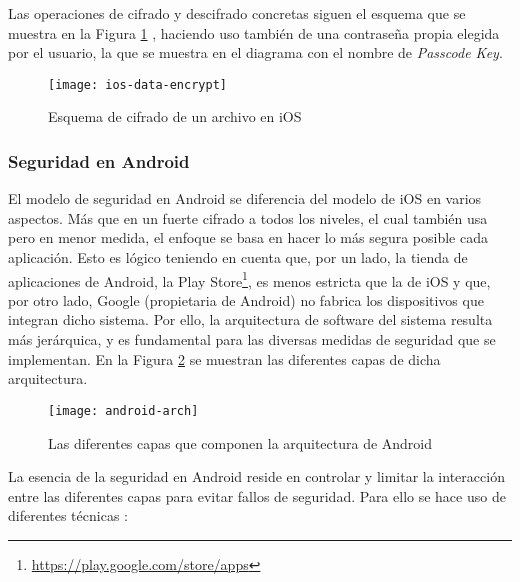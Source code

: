 Las operaciones de cifrado y descifrado concretas siguen el esquema que se muestra en la Figura \ref{fig:ios-data-encrypt} , haciendo uso también de una contraseña propia elegida por el usuario, la que se muestra en el diagrama con el nombre de \textit{Passcode Key}.

\begin{figure}[H]
	\centering
	\texttt{[image: ios-data-encrypt]}
	\caption{Esquema de cifrado de un archivo en iOS}
	\label{fig:ios-data-encrypt}
\end{figure}

\subsubsection{Seguridad en Android}

El modelo de seguridad en Android se diferencia del modelo de iOS en varios aspectos. Más que en un fuerte cifrado a todos los niveles, el cual también usa pero en menor medida, el enfoque se basa en hacer lo más segura posible cada aplicación. Esto es lógico teniendo en cuenta que, por un lado, la tienda de aplicaciones de Android, la Play Store\footnote{\url{https://play.google.com/store/apps}}, es menos estricta que la de iOS y que, por otro lado, Google (propietaria de Android) no fabrica los dispositivos que integran dicho sistema. Por ello, la arquitectura de software del sistema resulta más jerárquica, y es fundamental para las diversas medidas de seguridad que se implementan. En la Figura \ref{fig:android-arch} se muestran las diferentes capas de dicha arquitectura. 

\begin{figure}[H]
	\centering
	\texttt{[image: android-arch]}
	\caption{Las diferentes capas que componen la arquitectura de Android}
	\label{fig:android-arch}
\end{figure}

La esencia de la seguridad en Android reside en controlar y limitar la interacción entre las diferentes capas para evitar fallos de seguridad. Para ello se hace uso de diferentes técnicas \cite{android-sec-guide} \cite{jspdcp-2014}:

